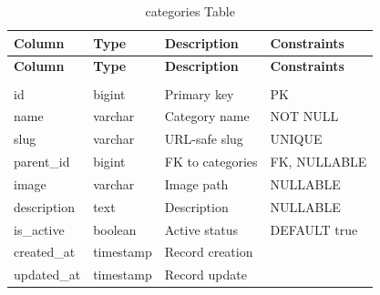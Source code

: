 \renewcommand{\arraystretch}{1.3}
\begin{longtable}{|p{3cm}|p{3cm}|p{4cm}|p{3cm}|}
    \hline
    \textbf{Column} & \textbf{Type} & \textbf{Description} & \textbf{Constraints} \\
    \hline
    \endfirsthead
    \hline
    \textbf{Column} & \textbf{Type} & \textbf{Description} & \textbf{Constraints} \\
    \hline
    \endhead
    \hline
    \endfoot
    \hline
    \caption{categories Table} \label{tab:categories} \\
    \endlastfoot
    id & bigint & Primary key & PK \\
    \hline
    name & varchar & Category name & NOT NULL \\
    \hline
    slug & varchar & URL-safe slug & UNIQUE \\
    \hline
    parent\_id & bigint & FK to categories & FK, NULLABLE \\
    \hline
    image & varchar & Image path & NULLABLE \\
    \hline
    description & text & Description & NULLABLE \\
    \hline
    is\_active & boolean & Active status & DEFAULT true \\
    \hline
    created\_at & timestamp & Record creation & \\
    \hline
    updated\_at & timestamp & Record update & \\
    \hline
\end{longtable}


